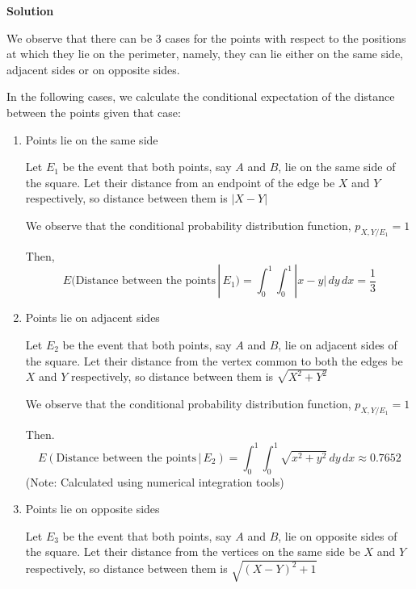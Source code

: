 \documentclass[12pt, oneside]{article}
\begin{document}
\begin{enumerate}
{    \textbf{Solution}

    We observe that there can be 3 cases for the points with respect to the positions at
    which they lie on the perimeter, namely, they can lie either on the same side, adjacent
    sides or on opposite sides.

    In the following cases, we calculate the conditional expectation of the distance between
    the points given that case:

    \begin{enumerate}
        \item {
            Points lie on the same side

            Let \(E_1\) be the event that both points, say \(A\) and \(B\), lie on
            the same side of the square. Let their distance from an endpoint of the edge
            be \(X\) and \(Y\) respectively, so distance between them is \(|X - Y|\)

            We observe that the conditional probability distribution function,
            \(p_{X, Y / E_1} = 1\) 

            Then, \[
                E(\text{Distance between the points} \,|\, E_1) = \int_{0}^{1} \int_{0}^{1}
                   |x - y| \,dy \,dx = \frac{1}{3}
            \]
        }

        \item {
            Points lie on adjacent sides

            Let \(E_2\) be the event that both points, say \(A\) and \(B\), lie on
            adjacent sides of the square. Let their distance from the vertex common to
            both the edges be \(X\) and \(Y\) respectively, so distance between them is
            \(\sqrt{X^2 + Y^2}\)

            We observe that the conditional probability distribution function,
            \(p_{X, Y / E_1} = 1\) 

            Then. \[
                E(\text{Distance between the points} \,|\, E_2) = \int_{0}^{1} \int_{0}^{1}
                \sqrt{x^2 + y^2} \,dy \,dx \approx 0.7652
            \]
            \hfill (Note: Calculated using numerical integration tools)
        }

        \item {
            Points lie on opposite sides

            Let \(E_3\) be the event that both points, say \(A\) and \(B\), lie on
            opposite sides of the square. Let their distance from the vertices on the
            same side be \(X\) and \(Y\) respectively, so distance between them is
            \(\sqrt{(X - Y)^2 + 1}\)

}
\end{enumerate}}
\end{enumerate}
\end{document}

